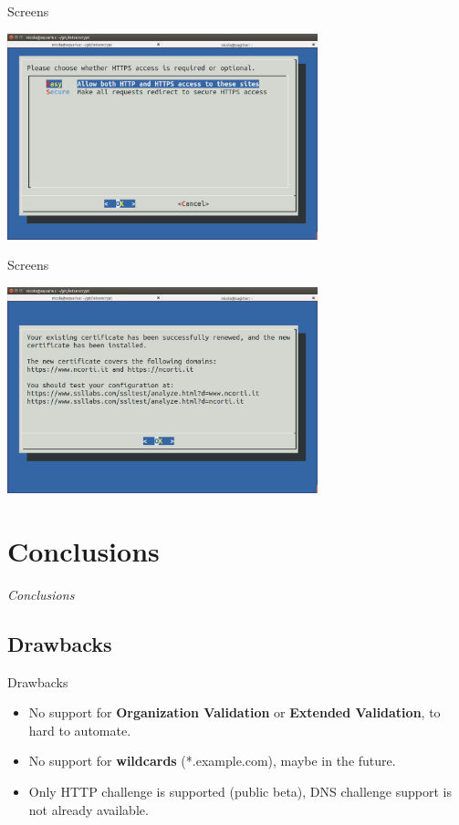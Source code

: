 \documentclass[xcolor=svgnames,11pt]{beamer}
\begin{document}
\begin{frame}{Screens}
\begin{center}
\includegraphics[width=9cm]{img/screen7.png}
\end{center}
\end{frame}
\begin{frame}{Screens}
\begin{center}
\includegraphics[width=9cm]{img/screen8.png}
\end{center}
\end{frame}


\section{Conclusions}
\begin{frame}{}
\begin{center}
\begin{Huge}
\textcolor{leorange}{\emph{Conclusions}}
\end{Huge}
\end{center}
\end{frame}



\subsection{Drawbacks}
\begin{frame}{Drawbacks}
\begin{itemize}
  \item No support for \textbf{Organization Validation} or \textbf{Extended Validation}, to hard to automate.
  \medskip\pause
  \item No support for \textbf{wildcards} (*.example.com), maybe in the future.
  \medskip\pause
  \item Only HTTP challenge is supported (public beta), DNS challenge support is not already available.
\end{itemize}
\end{frame}
\end{document}
